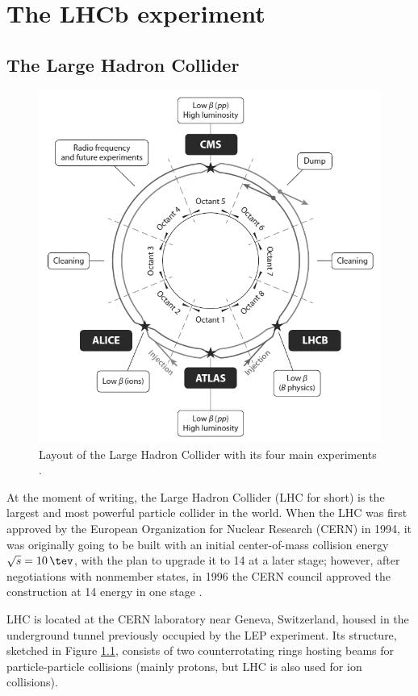 \chapter{The LHCb experiment}
\label{cap:LHCb}

\section{The Large Hadron Collider}
\label{sec:2:lhc}

\begin{figure}[t]
	\centering
	\includegraphics[width=.6\textwidth]{graphics/02-lhcb/lhc_diagram.png}
	\caption[LHC schematic layout.]{Layout of the Large Hadron Collider with its four main experiments \cite{doi:10.1146/annurev-nucl-102010-130438}.}
	\label{fig:2:lhc_diagram}
\end{figure}

At the moment of writing, the Large Hadron Collider (LHC for short) is the largest and most powerful particle collider in the world.
When the LHC was first approved by the European Organization for Nuclear Research (CERN) in 1994, it was originally going to be built with an initial center-of-mass collision energy $\sqrt{s} = \SI{10}{\tev}$, with the plan to upgrade it to \SI{14}{\tev} at a later stage;
however, after negotiations with nonmember states, in 1996 the CERN council approved the construction at \SI{14}{\tev} energy in one stage \cite{doi:10.1146/annurev-nucl-102010-130438}.

LHC is located at the CERN laboratory near Geneva, Switzerland, housed in the underground tunnel previously occupied by the LEP experiment.
Its structure, sketched in Figure \ref{fig:2:lhc_diagram}, consists of two counterrotating rings hosting beams for particle-particle collisions (mainly protons, but LHC is also used for ion collisions).

